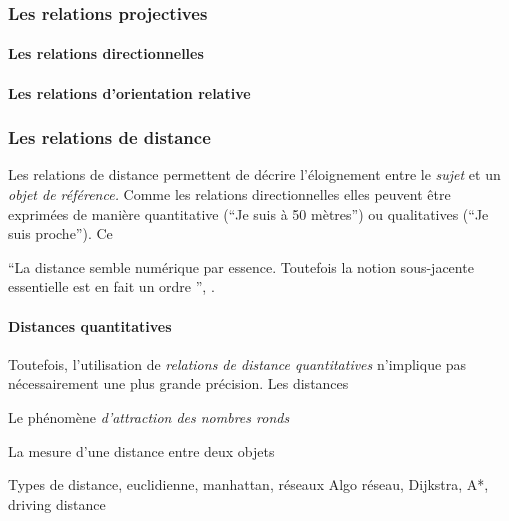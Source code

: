 \subsubsection{Les relations projectives}

\paragraph{Les relations directionnelles}

\paragraph{Les relations d'orientation relative}


\subsubsection{Les relations de distance}

Les relations de distance permettent de décrire l'éloignement entre le
\emph{sujet} et un \emph{objet de référence.} Comme les relations
directionnelles elles peuvent être exprimées de manière quantitative
(\eg \enquote{Je suis à 50 mètres}) ou qualitatives (\eg \enquote{Je
  suis proche}). Ce


\enquote{La distance \textelp{} semble \textelp{} numérique par
  essence. Toutefois \textelp{} la notion sous-jacente essentielle est
  en fait un ordre \textelp{}}, \textcite{Aurnague1997}.

\paragraph{Distances quantitatives}

Toutefois, l'utilisation de \emph{relations de distance quantitatives}
n'implique pas nécessairement une plus grande précision. Les distances


Le phénomène \emph{d'attraction des nombres ronds}

La mesure d'une distance entre deux objets 

Types de distance, euclidienne, manhattan, réseaux Algo réseau,
Dijkstra, A*, driving distance

